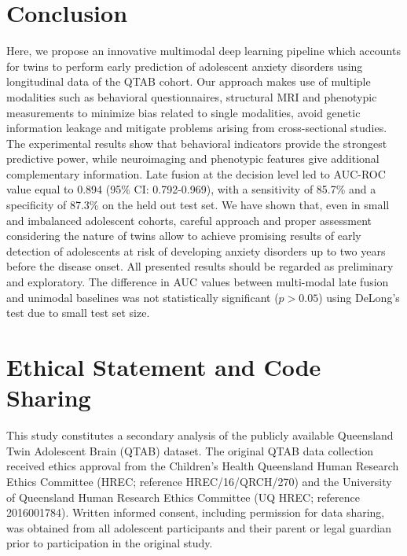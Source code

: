 \documentclass[10pt,letterpaper]{article}
\begin{document}
                                                                                                                                                                          \section*{Conclusion}
                                                                                             Here, we propose an innovative multimodal deep learning pipeline which accounts for twins to perform early prediction of adolescent anxiety disorders using longitudinal data of the QTAB cohort. Our approach makes use of multiple modalities such as behavioral questionnaires, structural MRI and phenotypic measurements to minimize bias related to single modalities, avoid genetic information leakage and mitigate problems arising from cross-sectional studies. The experimental results show that behavioral indicators provide the strongest predictive power, while neuroimaging and phenotypic features give additional complementary information. Late fusion at the decision level led to AUC-ROC value equal to 0.894 (95\% CI: 0.792-0.969), with a sensitivity of 85.7\% and a specificity of 87.3\% on the held out test set. We have shown that, even in small and imbalanced adolescent cohorts, careful approach and proper assessment considering the nature of twins allow to achieve promising results of early detection of adolescents at risk of developing anxiety disorders up to two years before the disease onset. All presented results should be regarded as preliminary and exploratory. The difference in AUC values between multi-modal late fusion and unimodal baselines was not statistically significant ($p > 0.05$) using DeLong's test due to small test set size.
                                                                                                                                                                          

 \section*{Ethical Statement and Code Sharing}

This study constitutes a secondary analysis of the publicly available Queensland Twin Adolescent Brain (QTAB) dataset. The original QTAB data collection received ethics approval from the Children's Health Queensland Human Research Ethics Committee (HREC; reference HREC/16/QRCH/270) and the University of Queensland Human Research Ethics Committee (UQ HREC; reference 2016001784). Written informed consent, including permission for data sharing, was obtained from all adolescent participants and their parent or legal guardian prior to participation in the original study.
\end{document}
